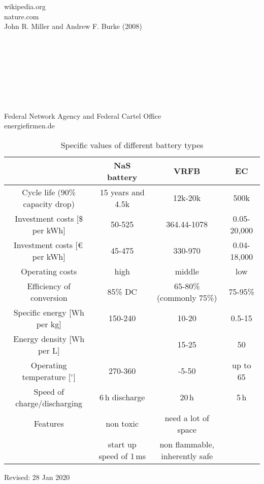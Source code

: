 \begin{parcolumns}[colwidths={1=2.5 cm, 2=10 cm, 3=2.5cm}]{3}
{\begin{tiny}
\\ \\ \\ \\ \\ \\ \\ \\ \\ \\ \\ \\ \\ \\ \\ \\ \\ \\ \\ \\ \\ \\ \\ \\  wikipedia.org\\nature.com \\ John R. Miller and Andrew F. Burke (2008)\\
\\ \\ \\ \\\\ \\  \\ \\  Federal Network Agency and Federal Cartel Office \\energiefirmen.de \end{tiny}
}

\end{parcolumns}
\begin{table}[H]
\centering
\caption{Specific values of different battery types}
\begin{tabular}{cccc}
\toprule
& NaS battery & VRFB & EC\\
\midrule
Cycle life (90\% capacity drop) & 15 years and 4.5k&12k-20k& 500k\\
Investment costs [\$ per kWh] & 50-525 & 364.44-1078&0.05-20,000\\
Investment costs [\euro \,per kWh]& 45-475 & 330-970& 0.04-18,000\\
Operating costs& high & middle & low\\
Efficiency of conversion & 85\% DC & 65-80\% (commonly 75\%) & 75-95\%\\
Specific energy [Wh per kg] & 150-240 & 10-20&0.5-15\\
Energy density [Wh per L] & & 15-25& 50\\
Operating temperature [$^\circ$]& 270-360& -5-50& up to 65 \\ 
Speed of charge/discharging &6\,h discharge &20\,h&5\,h\\
Features& non toxic & need a lot of space & \\
&start up speed of 1\,ms& non flammable, inherently safe &\\
\bottomrule
\end{tabular}
\end{table}
\begin{flushright}
Revised: 28 Jan 2020
\end{flushright}
\clearpage
\cfoot{}
